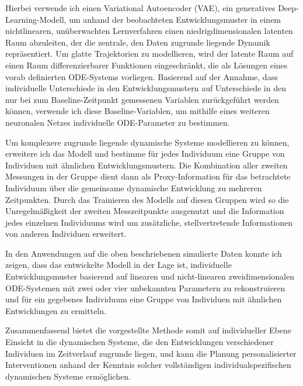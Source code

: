 Hierbei verwende ich einen Variational Autoencoder (VAE), ein generatives Deep-Learning-Modell, um anhand der beobachteten Entwicklungsmuster in einem nichtlinearen, unüberwachten Lernverfahren einen niedrigdimensionalen latenten Raum abzuleiten, der die zentrale, den Daten zugrunde liegende Dynamik repräsentiert. Um glatte Trajektorien zu modellieren, wird der latente Raum auf einen Raum differenzierbarer Funktionen eingeschränkt, die als Lösungen eines vorab definierten ODE-Systems vorliegen. Basierend auf der Annahme, dass individuelle Unterschiede in den Entwicklungsmustern auf Unterschiede in den nur bei zum Baseline-Zeitpunkt gemessenen Variablen zurückgeführt werden können, verwende ich diese Baseline-Variablen, um mithilfe eines weiteren neuronalen Netzes individuelle ODE-Parameter zu bestimmen.

Um komplexere zugrunde liegende dynamische Systeme modellieren zu können, erweitere ich das Modell und bestimme für jedes Individuum eine Gruppe von Individuen mit ähnlichen Entwicklungsmustern. Die Kombination aller zweiten Messungen in der Gruppe dient dann als Proxy-Information für das betrachtete Individuum über die gemeinsame dynamische Entwicklung zu mehreren Zeitpunkten. Durch das Trainieren des Modells auf diesen Gruppen wird so die Unregelmäßigkeit der zweiten Messzeitpunkte ausgenutzt und die Information jedes einzelnen Individuums wird um zusätzliche, stellvertretende Informationen von anderen Individuen erweitert.

In den Anwendungen auf die oben beschriebenen simulierte Daten konnte ich zeigen, dass das entwickelte Modell in der Lage ist, individuelle Entwicklungsmuster basierend auf linearen und nicht-linearen zweidimensionalen ODE-Systemen mit zwei oder vier unbekannten Parametern zu rekonstruieren und für ein gegebenes Individuum eine Gruppe von Individuen mit ähnlichen Entwicklungen zu ermitteln. 

Zusammenfassend bietet die vorgestellte Methode somit auf individueller Ebene Einsicht in die dynamischen Systeme, die den Entwicklungen verschiedener Individuen im Zeitverlauf zugrunde liegen, und kann die Planung personalisierter Interventionen anhand der Kenntnis solcher vollständigen individualspezifischen dynamischen Systeme ermöglichen.